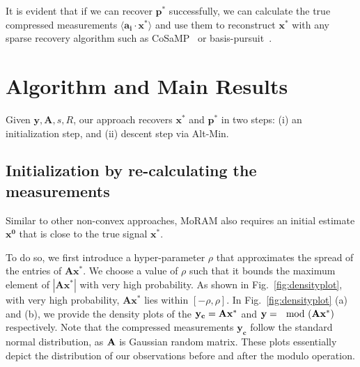 It is evident that if we can recover $\mathbf{p^*}$ successfully, we can calculate the true compressed measurements $\langle \mathbf{a_i} \cdot \mathbf{x^*} \rangle$ and use them to reconstruct $\mathbf{x^*}$ with any sparse recovery algorithm such as CoSaMP~\cite{needell2010cosamp} or basis-pursuit~\cite{chen2001atomic,spgl1:2007,BergFriedlander:2008}.

\section{Algorithm and Main Results}
Given $\mathbf{y, A}, s, R$, our approach recovers $\mathbf{x^*}$ and $\mathbf{p^*}$ in two steps: (i) an initialization step, and (ii) descent step via Alt-Min.

\subsection{Initialization by re-calculating the measurements}
\label{sec:init}	
Similar to other non-convex approaches, MoRAM also requires an initial estimate $\mathbf{{x}^0}$ that is close to the true signal $\mathbf{{x}^*}$.

To do so, we first introduce a hyper-parameter $\rho$ that approximates the spread of the entries of $\mathbf{Ax^*}$. We choose a value of $\rho$ such that it bounds the maximum element of $|\mathbf{Ax^*}|$ with very high probability. As shown in Fig.~\ref{fig:densityplot}, with very high probability, $\mathbf{Ax^*}$ lies within $[-\rho, \rho]$. In Fig.~\ref{fig:densityplot} (a) and (b), we provide the density plots of the $\mathbf{y_c} = \mathbf{Ax^*}$ and $\mathbf{y} = \mathbf{\mod(\mathbf{Ax^*})}$ respectively. Note that the compressed measurements $\mathbf{y_c}$ follow the standard normal distribution, as $\mathbf{A}$ is Gaussian random matrix. These plots essentially depict the distribution of our observations before and after the modulo operation.%

